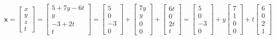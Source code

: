 \documentclass{report}
\begin{document}
\begin{equation}
\textbf{x}
=
\begin{bmatrix}
x \\ 
y \\ 
z \\
t
\end{bmatrix}
=
\begin{bmatrix}
5+7y-6t \\ 
y \\ 
-3+2t \\
t
\end{bmatrix}
=
\begin{bmatrix}
5 \\ 
0 \\ 
-3 \\
0
\end{bmatrix}
+
\begin{bmatrix}
7y \\ 
y \\ 
0 \\
0
\end{bmatrix}
+
\begin{bmatrix}
6t \\ 
0 \\ 
2t \\
t
\end{bmatrix}
=
\begin{bmatrix}
5 \\ 
0 \\ 
-3 \\
0
\end{bmatrix}
+
y
\begin{bmatrix}
7 \\ 
1 \\ 
0 \\
0
\end{bmatrix}
+
t
\begin{bmatrix}
6 \\ 
0 \\ 
2 \\
1
\end{bmatrix}
\end{equation}

\clearpage
\end{document}
